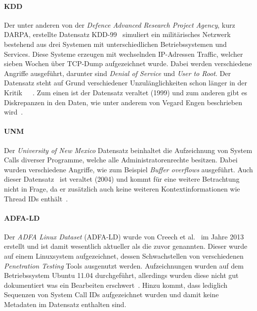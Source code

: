         \paragraph{KDD}
            Der unter anderen von der \textit{Defence Advanced Research Project Agency}, kurz DARPA, erstellte Datensatz KDD-99~\cite{DARPA}
            simuliert ein militärisches Netzwerk bestehend aus drei Systemen mit unterschiedlichen Betriebssystemen und Services. 
            Diese Systeme erzeugen mit wechselnden IP-Adressen Traffic, welcher sieben Wochen über TCP-Dump aufgezeichnet wurde.
            Dabei werden verschiedene Angriffe ausgeführt, darunter sind \textit{Denial of Service} und \textit{User to Root}.
            Der Datensatz steht auf Grund verschiedener Unzulänglichkeiten schon länger in der Kritik~\cite{KDD}~\cite{KDD2}~\cite{UNM}.
            Zum einen ist der Datensatz veraltet (1999) und zum anderen gibt es Diskrepanzen in den Daten, wie unter anderem von Vegard Engen beschrieben wird~\cite{KDD}.
        \paragraph{UNM}
            Der \textit{University of New Mexico} Datensatz beinhaltet die Aufzeichnung von System Calls diverser Programme, welche alle Administratorenrechte besitzen.
            Dabei wurden verschiedene Angriffe, wie zum Beispiel \textit{Buffer  overflows} ausgeführt.
            Auch dieser Datensatz~\cite{UNM} ist veraltet (2004) und kommt für eine weitere Betrachtung nicht in Frage,
            da er zusätzlich auch keine weiteren Kontextinformationen wie Thread IDs enthält~\cite{UNMcritic}.
        \paragraph{ADFA-LD}
            Der \textit{ADFA Linux Dataset} (ADFA-LD) wurde von Creech et al.~\cite{UNMcritic} im Jahre 2013 erstellt und ist damit wesentlich aktueller als die zuvor genannten.
            Dieser wurde auf einem Linuxsystem aufgezeichnet, dessen Schwachstellen von verschiedenen \textit{Penetration Testing} Tools ausgenutzt werden.
            Aufzeichnungen wurden auf dem Betriebssystem Ubuntu 11.04 durchgeführt, allerdings wurden diese nicht gut dokumentiert was ein Bearbeiten erschwert~\cite{ADFA-LDcritic}.
            Hinzu kommt, dass lediglich Sequenzen von System Call IDs aufgezeichnet wurden und damit keine Metadaten im Datensatz enthalten sind.
